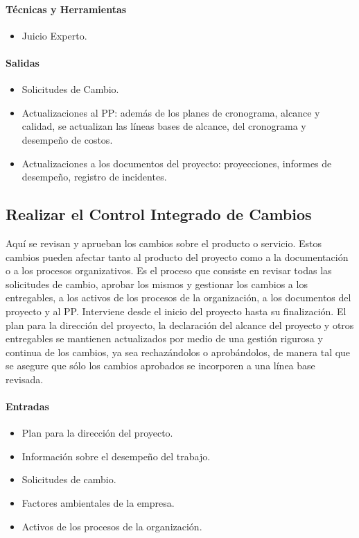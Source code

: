 \documentclass[a4paper,twosides]{article}
\newlength{\wideitemsep}
\let\olditem\item
\renewcommand{\item}{\setlength{\itemsep}{\wideitemsep}\olditem}
\begin{document}
\paragraph{Técnicas y Herramientas}
\begin{itemize}
\item Juicio Experto.
\end{itemize}
\paragraph{Salidas}
\begin{itemize}
\item Solicitudes de Cambio.
\item Actualizaciones al PP: además de los planes de cronograma, alcance y calidad, se actualizan las líneas bases de alcance, del cronograma y desempeño de costos.
\item Actualizaciones a los documentos del proyecto: proyecciones, informes de desempeño, registro de incidentes.
\end{itemize}
\subsection{Realizar el Control Integrado de Cambios} \label{sec:control_integrado}
Aquí se revisan y aprueban los cambios sobre el producto o servicio. Estos cambios pueden afectar tanto al producto del proyecto como a la documentación o a los procesos organizativos.
Es el proceso que consiste en revisar todas las solicitudes de cambio, aprobar los mismos y gestionar los cambios a los entregables, a los activos de los procesos de la organización, a los documentos del proyecto y al PP. Interviene desde el inicio del proyecto hasta su finalización.
El plan para la dirección del proyecto, la declaración del alcance del proyecto y otros entregables se mantienen actualizados por medio de una gestión rigurosa y continua de los cambios, ya sea rechazándolos o aprobándolos, de manera tal que se asegure que sólo los cambios aprobados se incorporen a una línea base revisada.
\paragraph{Entradas}
\begin{itemize}
\item Plan para la dirección del proyecto.
\item Información sobre el desempeño del trabajo.
\item Solicitudes de cambio.
\item Factores ambientales de la empresa.
\item Activos de los procesos de la organización.
\end{itemize}
\end{document}
